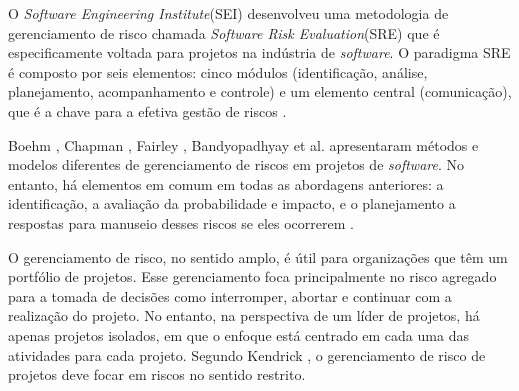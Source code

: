 O \textit{Software Engineering Institute}(SEI) desenvolveu uma metodologia de gerenciamento de risco chamada \textit{Software Risk Evaluation}(SRE) que é especificamente voltada para projetos na indústria de \textit{software}. O paradigma SRE é composto por seis elementos: cinco módulos (identificação, análise, planejamento, acompanhamento e controle) e um elemento central (comunicação), que é a chave para a efetiva gestão de riscos \cite{HIGUERAHAIMES1996} \cite{williams1999software}.

Boehm \cite{BOEHM1991}, Chapman \cite{chapman1996project}, Fairley \cite{fairley1994risk}, Bandyopadhyay et al. \cite{bandyopadhyay1999framework} apresentaram métodos e modelos diferentes de gerenciamento de riscos em projetos de \textit{software}. No entanto, há elementos em comum em todas as abordagens anteriores: a identificação, a avaliação da probabilidade e impacto, e o planejamento a respostas para manuseio desses riscos se eles ocorrerem \cite{holzmann2011developing}.

O gerenciamento de risco, no sentido amplo, é útil para organizações que têm um portfólio de projetos. Esse gerenciamento foca principalmente no risco agregado para a tomada de decisões como interromper, abortar e continuar com a realização do projeto. No entanto, na perspectiva de um líder de projetos, há apenas projetos isolados, em que o enfoque está centrado em cada uma das atividades para cada projeto. Segundo Kendrick \cite{kendrick2003identifying}, o gerenciamento de risco de projetos deve focar em riscos no sentido restrito.

